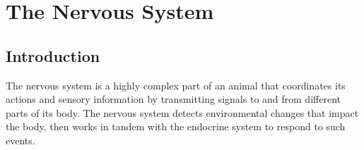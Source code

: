 \documentclass[]{book}
\begin{document}
\hypertarget{the-nervous-system}{%
\chapter{The Nervous System}\label{the-nervous-system}}

\hypertarget{introduction}{%
\section{Introduction}\label{introduction}}

The nervous system is a highly complex part of an animal that coordinates its actions and sensory information by transmitting signals to and from different parts of its body. The nervous system detects environmental changes that impact the body, then works in tandem with the endocrine system to respond to such events.
\end{document}

